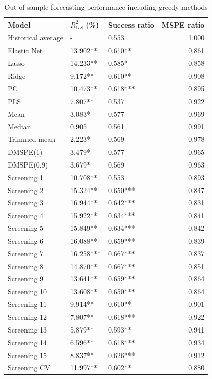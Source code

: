 \begin{table}

\caption{Out-of-sample forecasting performance including greedy methods}
\centering
\begin{tabular}[t]{lllr}
\toprule
Model & $R^2_{OS}$ (\%) & Success ratio & MSPE ratio\\
\midrule
Historical average & - & 0.553 & 1.000\\
Elastic Net & 13.902** & 0.610** & 0.861\\
Lasso & 14.233** & 0.585* & 0.858\\
Ridge & 9.172** & 0.610** & 0.908\\
PC & 10.473** & 0.618*** & 0.895\\
\addlinespace
PLS & 7.807** & 0.537 & 0.922\\
Mean & 3.083* & 0.577 & 0.969\\
Median & 0.905 & 0.561 & 0.991\\
Trimmed mean & 2.223* & 0.569 & 0.978\\
DMSPE(1) & 3.479* & 0.577 & 0.965\\
\addlinespace
DMSPE(0.9) & 3.679* & 0.569 & 0.963\\
Screening 1 & 10.708** & 0.553 & 0.893\\
Screening 2 & 15.324** & 0.650*** & 0.847\\
Screening 3 & 16.944** & 0.642*** & 0.831\\
Screening 4 & 15.922** & 0.634*** & 0.841\\
\addlinespace
Screening 5 & 15.849** & 0.634*** & 0.842\\
Screening 6 & 16.088** & 0.659*** & 0.839\\
Screening 7 & 16.258*** & 0.667*** & 0.837\\
Screening 8 & 14.870** & 0.667*** & 0.851\\
Screening 9 & 13.641** & 0.659*** & 0.864\\
\addlinespace
Screening 10 & 13.608** & 0.650*** & 0.864\\
Screening 11 & 9.914** & 0.610** & 0.901\\
Screening 12 & 7.807** & 0.618*** & 0.922\\
Screening 13 & 5.879** & 0.593** & 0.941\\
Screening 14 & 6.596** & 0.618*** & 0.934\\
\addlinespace
Screening 15 & 8.837** & 0.626*** & 0.912\\
Screening CV & 11.997** & 0.602** & 0.880\\

\end{tabular}
\end{table}

